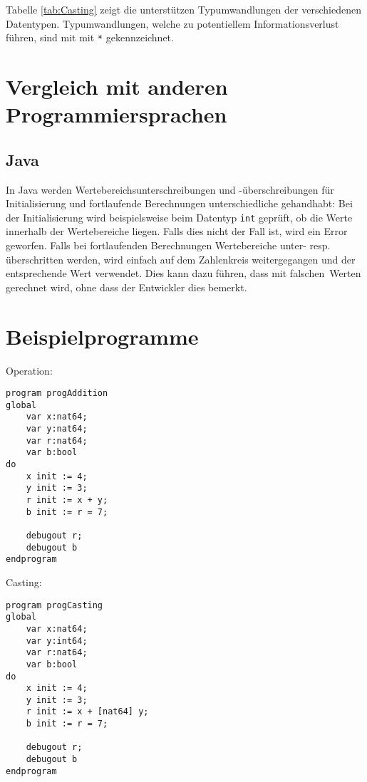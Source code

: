 \documentclass[10pt, a4paper, twocolumn]{article} %
\begin{document}
Tabelle \ref{tab:Casting} zeigt die unterstützen Typumwandlungen der verschiedenen Datentypen.
Typumwandlungen, welche zu potentiellem Informationsverlust führen, sind mit mit \texttt{*} gekennzeichnet.
\begin{table}[h]
    \tiny
    \centering
    \caption{Casting zwischen Datentypen}
    \label{tab:Casting}
\end{table}

\section{Vergleich mit anderen Programmiersprachen}
\subsection{Java}
In Java werden Wertebereichsunterschreibungen und -überschreibungen für Initialisierung und fortlaufende Berechnungen unterschiedliche gehandhabt:
Bei der Initialisierung wird beispielsweise beim Datentyp \texttt{int} geprüft, ob die Werte innerhalb der Wertebereiche liegen. Falls dies nicht der Fall ist, wird ein Error geworfen.
Falls bei fortlaufenden Berechnungen Wertebereiche unter- resp. überschritten werden, wird einfach auf dem Zahlenkreis weitergegangen und der entsprechende Wert verwendet.
Dies kann dazu führen, dass mit \glqq falschen\grqq \ Werten gerechnet wird, ohne dass der Entwickler dies bemerkt.

\section{Beispielprogramme}
\label{sec:prog}
Operation:
\begin{lstlisting}
program progAddition
global
    var x:nat64;
    var y:nat64;
    var r:nat64;
    var b:bool
do
    x init := 4;
    y init := 3;
    r init := x + y;
    b init := r = 7;

    debugout r;
    debugout b
endprogram
\end{lstlisting}
Casting:
\begin{lstlisting}
program progCasting
global
    var x:nat64;
    var y:int64;
    var r:nat64;
    var b:bool
do
    x init := 4;
    y init := 3;
    r init := x + [nat64] y;
    b init := r = 7;

    debugout r;
    debugout b
endprogram
\end{lstlisting}
\end{document}

